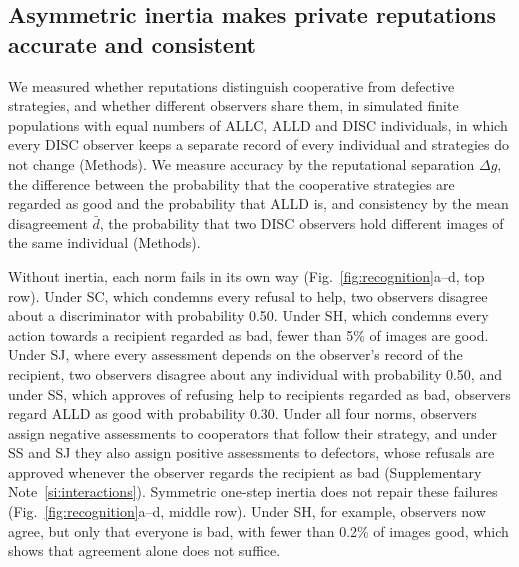 \documentclass[10pt]{wlscirep}
\theoremstyle{plain}
\theoremstyle{remark}
\begin{document}
\subsection*{Asymmetric inertia makes private reputations accurate and consistent}

We measured whether reputations distinguish cooperative from defective strategies, and whether different observers share them, in simulated finite populations with equal numbers of ALLC, ALLD and DISC individuals, in which every DISC observer keeps a separate record of every individual and strategies do not change (Methods). We measure accuracy by the reputational separation $\Delta g$, the difference between the probability that the cooperative strategies are regarded as good and the probability that ALLD is, and consistency by the mean disagreement $\bar d$, the probability that two DISC observers hold different images of the same individual (Methods).

Without inertia, each norm fails in its own way (Fig.~\ref{fig:recognition}a--d, top row). Under SC, which condemns every refusal to help, two observers disagree about a discriminator with probability 0.50. Under SH, which condemns every action towards a recipient regarded as bad, fewer than 5\% of images are good. Under SJ, where every assessment depends on the observer's record of the recipient, two observers disagree about any individual with probability 0.50, and under SS, which approves of refusing help to recipients regarded as bad, observers regard ALLD as good with probability 0.30. Under all four norms, observers assign negative assessments to cooperators that follow their strategy, and under SS and SJ they also assign positive assessments to defectors, whose refusals are approved whenever the observer regards the recipient as bad (Supplementary Note~\ref{si:interactions}). Symmetric one-step inertia does not repair these failures (Fig.~\ref{fig:recognition}a--d, middle row). Under SH, for example, observers now agree, but only that everyone is bad, with fewer than 0.2\% of images good, which shows that agreement alone does not suffice.
\end{document}
